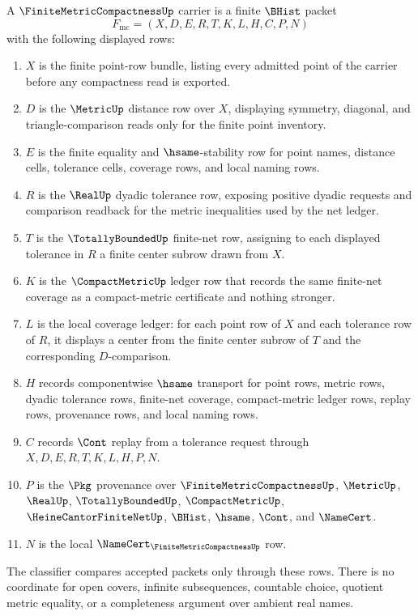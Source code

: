\begin{definition}
\label{def:finite-metric-compactness-carrier}
A $\FiniteMetricCompactnessUp$ carrier is a finite $\BHist$ packet
$$
F_{\mathrm{mc}}=(X,D,E,R,T,K,L,H,C,P,N)
$$
with the following displayed rows:
\begin{enumerate}
  \item $X$ is the finite point-row bundle, listing every admitted point of the carrier before any compactness read is exported.
  \item $D$ is the $\MetricUp$ distance row over $X$, displaying symmetry, diagonal, and triangle-comparison reads only for the finite point inventory.
  \item $E$ is the finite equality and $\hsame$-stability row for point names, distance cells, tolerance cells, coverage rows, and local naming rows.
  \item $R$ is the $\RealUp$ dyadic tolerance row, exposing positive dyadic requests and comparison readback for the metric inequalities used by the net ledger.
  \item $T$ is the $\TotallyBoundedUp$ finite-net row, assigning to each displayed tolerance in $R$ a finite center subrow drawn from $X$.
  \item $K$ is the $\CompactMetricUp$ ledger row that records the same finite-net coverage as a compact-metric certificate and nothing stronger.
  \item $L$ is the local coverage ledger: for each point row of $X$ and each tolerance row of $R$, it displays a center from the finite center subrow of $T$ and the corresponding $D$-comparison.
  \item $H$ records componentwise $\hsame$ transport for point rows, metric rows, dyadic tolerance rows, finite-net coverage, compact-metric ledger rows, replay rows, provenance rows, and local naming rows.
  \item $C$ records $\Cont$ replay from a tolerance request through $X,D,E,R,T,K,L,H,P,N$.
  \item $P$ is the $\Pkg$ provenance over $\FiniteMetricCompactnessUp$, $\MetricUp$, $\RealUp$, $\TotallyBoundedUp$, $\CompactMetricUp$, $\HeineCantorFiniteNetUp$, $\BHist$, $\hsame$, $\Cont$, and $\NameCert$.
  \item $N$ is the local $\NameCert_{\FiniteMetricCompactnessUp}$ row.
\end{enumerate}
The classifier compares accepted packets only through these rows. There is no coordinate for open covers, infinite subsequences, countable choice, quotient metric equality, or a completeness argument over ambient real names.
\end{definition}


